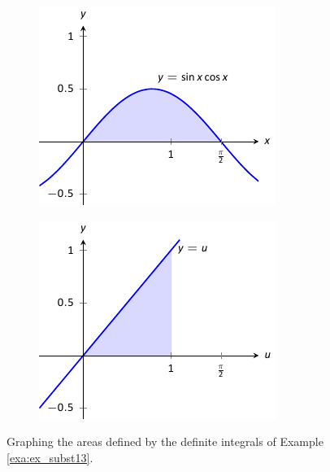 \begin{solution}
{\begin{figure}
\centering
\begin{subfigure}{.5\textwidth}
  \centering
  \includegraphics[width=.8\linewidth]{figures/figsubst13a}
  \caption{}
  \label{fig:sub1}
\end{subfigure}%
\begin{subfigure}{.5\textwidth}
  \centering
  \includegraphics[width=.8\linewidth]{figures/figsubst13b}
  \caption{}
  \label{fig:sub2}
\end{subfigure}
\caption{Graphing the areas defined by the definite integrals of Example \ref{exa:ex_subst13}. \label{fig:subst13}}
\label{fig:test}
\end{figure}

}
\end{solution}

